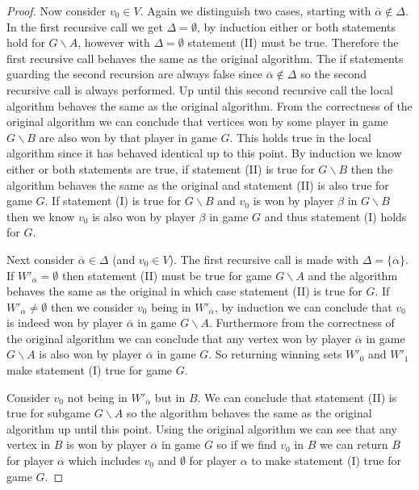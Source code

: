 \begin{theorem}
\begin{proof}
	Now consider $v_0 \in V$. Again we distinguish two cases, starting with $\overline{\alpha} \notin \Delta$. In the first recursive call we get $\Delta = \emptyset$, by induction either or both statements hold for $G\backslash A$, however with $\Delta = \emptyset$ statement (II) must be true. Therefore the first recursive call behaves the same as the original algorithm. The if statements guarding the second recursion are always false since $\overline{\alpha} \notin \Delta$ so the second recursive call is always performed. Up until this second recursive call the local algorithm behaves the same as the original algorithm. From the correctness of the original algorithm we can conclude that vertices won by some player in game $G\backslash B$ are also won by that player in game $G$. This holds true in the local algorithm since it has behaved identical up to this point. By induction we know either or both statements are true, if statement (II) is true for $G\backslash B$ then the algorithm behaves the same as the original and statement (II) is also true for game $G$. If statement (I) is true for $G \backslash B$ and $v_0$ is won by player $\beta$ in $G\backslash B$ then we know $v_0$ is also won by player $\beta$ in game $G$ and thus statement (I) holds for $G$.
	
	Next consider $\overline{\alpha} \in \Delta$ (and $v_0 \in V$). The first recursive call is made with $\Delta = \{\overline{\alpha}\}$. If $W'_{\overline{\alpha}} = \emptyset$ then statement (II) must be true for game $G\backslash A$ and the algorithm behaves the same as the original in which case statement (II) is true for $G$. If $W'_{\overline{\alpha}} \neq \emptyset$ then we consider $v_0$ being in $W'_{\overline{\alpha}}$, by induction we can conclude that $v_0$ is indeed won by player $\overline{\alpha}$ in game $G\backslash A$. Furthermore from the correctness of the original algorithm we can conclude that any vertex won by player $\overline{\alpha}$ in game $G\backslash A$ is also won by player $\overline{\alpha}$ in game $G$. So returning winning sets $W'_0$ and $W'_1$ make statement (I) true for game $G$.
	
	Consider $v_0$ not being in $W'_{\overline{\alpha}}$ but in $B$. We can conclude that statement (II) is true for subgame $G\backslash A$ so the algorithm behaves the same as the original algorithm up until this point. Using the original algorithm we can see that any vertex in $B$ is won by player $\overline{\alpha}$ in game $G$ so if we find $v_0$ in $B$ we can return $B$ for player $\overline{\alpha}$ which includes $v_0$ and $\emptyset$ for player $\alpha$ to make statement (I) true for game $G$.
	

\end{proof}
\end{theorem}
